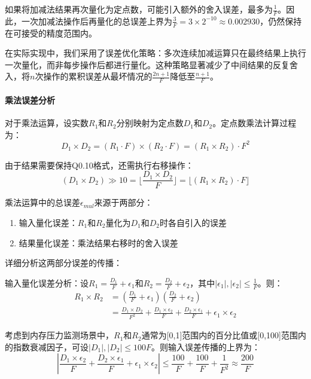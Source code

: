 如果将加减法结果再次量化为定点数，可能引入额外的舍入误差，最多为$\frac{1}{F}$。因此，一次加减法操作后再量化的总误差上界为$\frac{3}{F} = 3 \times 2^{-10} \approx 0.002930$，仍然保持在可接受的精度范围内。

在实际实现中，我们采用了误差优化策略：多次连续加减运算只在最终结果上执行一次量化，而非每步操作后都进行量化。这种策略显著减少了中间结果的反复舍入，将$n$次操作的累积误差从最坏情况的$\frac{2n+1}{F}$降低至$\frac{n+1}{F}$。

\paragraph{乘法误差分析}\quad
对于乘法运算，设实数$R_1$和$R_2$分别映射为定点数$D_1$和$D_2$。定点数乘法计算过程为：
\begin{equation}
D_1 \times D_2 = (R_1 \cdot F) \times (R_2 \cdot F) = (R_1 \times R_2) \cdot F^2
\end{equation}

由于结果需要保持Q0.10格式，还需执行右移操作：
\begin{equation}
(D_1 \times D_2) \gg 10 = \lfloor \frac{D_1 \times D_2}{F} \rfloor = \lfloor (R_1 \times R_2) \cdot F \rfloor
\end{equation}

乘法运算中的总误差$\epsilon_{mul}$来源于两部分：
\begin{enumerate}
    \item 输入量化误差：$R_1$和$R_2$量化为$D_1$和$D_2$时各自引入的误差
    \item 结果量化误差：乘法结果右移时的舍入误差
\end{enumerate}

详细分析这两部分误差的传播：

输入量化误差分析：设$R_1 = \frac{D_1}{F} + \epsilon_1$和$R_2 = \frac{D_2}{F} + \epsilon_2$，其中$|\epsilon_1|, |\epsilon_2| \leq \frac{1}{F}$。则：
\[
\begin{aligned}
R_1 \times R_2 &= (\frac{D_1}{F} + \epsilon_1)(\frac{D_2}{F} + \epsilon_2) \\
&= \frac{D_1 \times D_2}{F^2} + \frac{D_1 \times \epsilon_2}{F} + \frac{D_2 \times \epsilon_1}{F} + \epsilon_1 \times \epsilon_2
\end{aligned}
\]

考虑到内存压力监测场景中，$R_1$和$R_2$通常为[0,1]范围内的百分比值或[0,100]范围内的指数衰减因子，可设$|D_1|, |D_2| \leq 100F$。则输入误差传播的上界为：
\begin{equation}
|\frac{D_1 \times \epsilon_2}{F} + \frac{D_2 \times \epsilon_1}{F} + \epsilon_1 \times \epsilon_2| \leq \frac{100}{F} + \frac{100}{F} + \frac{1}{F^2} \approx \frac{200}{F}
\end{equation}

